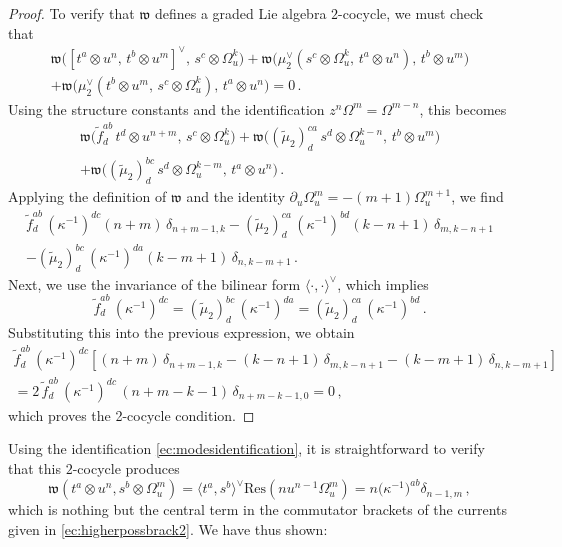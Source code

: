 \documentclass[11pt]{amsart}
\numberwithin{equation}{section}
\numberwithin{figure}{section}
\numberwithin{table}{section}
\theoremstyle{thm}
\numberwithin{equation}{subsection}
\theoremstyle{definition}
\theoremstyle{rem}
\begin{document}
\begin{proof}
To verify that $\mathfrak{w}$ defines a graded Lie algebra $2$-cocycle, we must check that
\begin{multline}
\mathfrak{w}\big([t^a \otimes u^n,\, t^b \otimes u^m]^\vee,\, s^c \otimes \Omega^k_u\big) 
+ \mathfrak{w}\big(\mu_2^\vee(s^c\otimes \Omega_u^k,\, t^a\otimes u^n),\, t^b\otimes u^m\big)\\
+ \mathfrak{w}\big(\mu_2^\vee(t^b\otimes u^m,\, s^c\otimes \Omega_u^k),\, t^a\otimes u^n\big) = 0\,.
\end{multline}
Using the structure constants and the identification $z^n \Omega^m = \Omega^{m-n}$, this becomes
\begin{multline}
\mathfrak{w}\big(\tilde{f}^{ab}_d\, t^d \otimes u^{n+m},\, s^c \otimes \Omega_u^k\big) 
+ \mathfrak{w}\big((\tilde{\mu}_2)^{ca}_d\, s^d \otimes \Omega_u^{k-n},\, t^b \otimes u^m\big) \\
+ \mathfrak{w}\big((\tilde{\mu}_2)^{bc}_d\, s^d \otimes \Omega^{k-m}_u,\, t^a \otimes u^n\big)\,.
\end{multline}
Applying the definition of $\mathfrak{w}$ and the identity $\partial_u \Omega^m_u = -(m+1)\Omega_u^{m+1}$, we find
\begin{multline}
\tilde{f}^{ab}_d\, (\kappa^{-1})^{dc} (n+m)\, \delta_{n+m-1,k}
- (\tilde{\mu}_2)^{ca}_d\, (\kappa^{-1})^{bd} (k-n+1)\, \delta_{m,k-n+1} \\
- (\tilde{\mu}_2)^{bc}_d\, (\kappa^{-1})^{da} (k-m+1)\, \delta_{n,k-m+1}\,.
\end{multline}
Next, we use the invariance of the bilinear form $\langle \cdot, \cdot \rangle^\vee$, which implies
\begin{equation}
\tilde{f}^{ab}_d\, (\kappa^{-1})^{dc}
= (\tilde{\mu}_2)^{bc}_d\, (\kappa^{-1})^{da}
= (\tilde{\mu}_2)^{ca}_d\, (\kappa^{-1})^{bd}\,.
\end{equation}
Substituting this into the previous expression, we obtain
\begin{multline}
\tilde{f}^{ab}_d\, (\kappa^{-1})^{dc}
\left[ (n+m)\, \delta_{n+m-1,k} - (k-n+1)\, \delta_{m,k-n+1} - (k-m+1)\, \delta_{n,k-m+1} \right] \\
= 2\, \tilde{f}^{ab}_d\, (\kappa^{-1})^{dc}\, (n+m-k-1)\, \delta_{n+m-k-1,0} = 0\,,
\end{multline}
which proves the 2-cocycle condition.
\end{proof}

Using the identification \eqref{ec:modesidentification}, it is straightforward to verify that this $2$-cocycle produces 
\begin{equation}
    \mathfrak{w} (t^a\otimes u^n,s^b\otimes \Omega_u^m) = \langle t^a,s^b\rangle^\vee \mathrm{Res} (nu^{n-1} \Omega_u^m) = n \big(\kappa^{-1}\big)^{ab}\delta_{n-1,m}\,,
\end{equation}
which is nothing but the central term in the commutator brackets of the currents given in \eqref{ec:higherpossbrack2}. We have thus shown:
\end{document}
